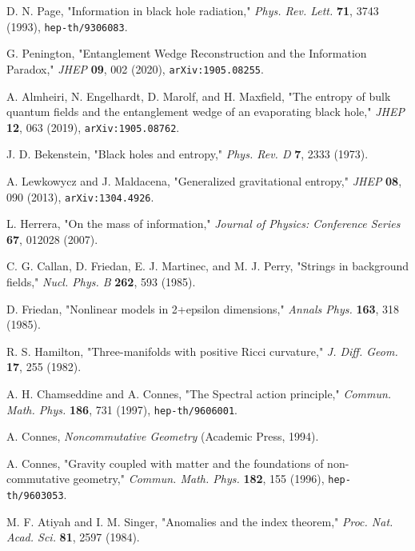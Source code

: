 \documentclass[11pt, letterpaper]{report}
\theoremstyle{plain} %
\theoremstyle{definition} %
\theoremstyle{remark} %
\begin{document}
\begin{thebibliography}{99}
D. N. Page, "Information in black hole radiation," \textit{Phys. Rev. Lett.} \textbf{71}, 3743 (1993), \texttt{hep-th/9306083}.

G. Penington, "Entanglement Wedge Reconstruction and the Information Paradox," \textit{JHEP} \textbf{09}, 002 (2020), \texttt{arXiv:1905.08255}.

A. Almheiri, N. Engelhardt, D. Marolf, and H. Maxfield, "The entropy of bulk quantum fields and the entanglement wedge of an evaporating black hole," \textit{JHEP} \textbf{12}, 063 (2019), \texttt{arXiv:1905.08762}.

J. D. Bekenstein, "Black holes and entropy," \textit{Phys. Rev. D} \textbf{7}, 2333 (1973).

\label{Lewkowycz2013}
A. Lewkowycz and J. Maldacena, "Generalized gravitational entropy," \textit{JHEP} \textbf{08}, 090 (2013), \texttt{arXiv:1304.4926}.

L. Herrera, "On the mass of information," \textit{Journal of Physics: Conference Series} \textbf{67}, 012028 (2007).

C. G. Callan, D. Friedan, E. J. Martinec, and M. J. Perry, "Strings in background fields," \textit{Nucl. Phys. B} \textbf{262}, 593 (1985).

D. Friedan, "Nonlinear models in 2+epsilon dimensions," \textit{Annals Phys.} \textbf{163}, 318 (1985).

R. S. Hamilton, "Three-manifolds with positive Ricci curvature," \textit{J. Diff. Geom.} \textbf{17}, 255 (1982).

\label{Chamseddine1997SpectralAction}
A. H. Chamseddine and A. Connes, "The Spectral action principle," \textit{Commun. Math. Phys.} \textbf{186}, 731 (1997), \texttt{hep-th/9606001}.

A. Connes, \textit{Noncommutative Geometry} (Academic Press, 1994).

A. Connes, "Gravity coupled with matter and the foundations of non-commutative geometry," \textit{Commun. Math. Phys.} \textbf{182}, 155 (1996), \texttt{hep-th/9603053}.

M. F. Atiyah and I. M. Singer, "Anomalies and the index theorem," \textit{Proc. Nat. Acad. Sci.} \textbf{81}, 2597 (1984).


\end{thebibliography}
\end{document}
